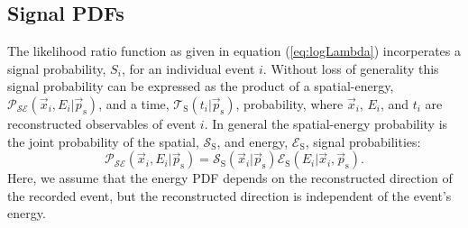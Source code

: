 \documentclass{article}
\newcommand{\eq}[1]{(\ref{#1})}
\newcommand{\ps}{\vec{p}_{\mathrm{s}}}
\begin{document}
\subsection{Signal PDFs}

The likelihood ratio function as given in equation \eq{eq:logLambda}
incorperates a signal probability, $S_i$, for an individual event $i$.
Without loss of generality this signal probability can be expressed as the
product of a spatial-energy, $\mathcal{P}_{\mathcal{SE}}(\vec{x}_i,E_i|\ps)$, and a time,
$\mathcal{T}_{\mathrm{S}}(t_i|\ps)$, probability, where $\vec{x}_i$, $E_i$, and $t_i$ are
reconstructed observables of event $i$. In general the spatial-energy probability
is the joint probability of the spatial, $\mathcal{S}_{\mathrm{S}}$, and energy,
$\mathcal{E}_{\mathrm{S}}$, signal probabilities:
\begin{equation}
 \mathcal{P}_{\mathcal{SE}}(\vec{x}_i,E_i|\ps) = \mathcal{S}_{\mathrm{S}}(\vec{x}_i|\ps) \mathcal{E}_{\mathrm{S}}(E_i|\vec{x}_i,\ps).
\end{equation}
Here, we assume that the energy PDF depends on the reconstructed direction of
the recorded event, but the reconstructed direction is independent of the
event's energy.
\end{document}
